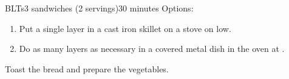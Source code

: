 \documentclass[../Cookbook.tex]{subfiles}
\begin{document}
\begin{recipe}{BLTs}{3 sandwiches (2 servings)}{30 minutes}
  Options:
  \begin{enumerate}
    \item Put a single layer in a cast iron skillet on a stove on low.
    \item Do as many layers as necessary in a covered metal dish in the oven at .
  \end{enumerate}

  Toast the bread and prepare the vegetables.
\end{recipe}
\end{document}
